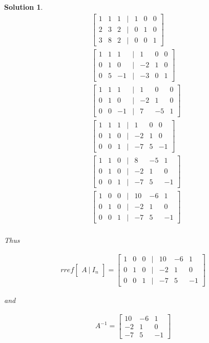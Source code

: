 \documentclass{article}
\newtheorem*{solution}{Solution}
\begin{document}
\begin{solution}
\begin{align*}
& \begin{bmatrix}
1 & 1 & 1 & \vert & 1 & 0 & 0 \\
2 & 3 & 2 & \vert & 0 & 1 & 0 \\
3 & 8 & 2 & \vert & 0 & 0 & 1
\end{bmatrix} \\
& \begin{bmatrix}
1 & 1 & 1 & \vert & 1 & 0 & 0 \\
0 & 1 & 0 & \vert & -2 & 1 & 0 \\
0 & 5 & -1 & \vert & -3 & 0 & 1
\end{bmatrix} \\
& \begin{bmatrix}
1 & 1 & 1 & \vert & 1 & 0 & 0 \\
0 & 1 & 0 & \vert & -2 & 1 & 0 \\
0 & 0 & -1 & \vert & 7 & -5 & 1
\end{bmatrix} \\
& \begin{bmatrix}
1 & 1 & 1 & \vert & 1 & 0 & 0 \\
0 & 1 & 0 & \vert & -2 & 1 & 0 \\
0 & 0 & 1 & \vert & -7 & 5 & -1
\end{bmatrix} \\
& \begin{bmatrix}
1 & 1 & 0 & \vert & 8 & -5 & 1 \\
0 & 1 & 0 & \vert & -2 & 1 & 0 \\
0 & 0 & 1 & \vert & -7 & 5 & -1
\end{bmatrix} \\
& \begin{bmatrix}
1 & 0 & 0 & \vert & 10 & -6 & 1 \\
0 & 1 & 0 & \vert & -2 & 1 & 0 \\
0 & 0 & 1 & \vert & -7 & 5 & -1
\end{bmatrix} \\
\end{align*}

Thus 

\begin{align*}
rref \begin{bmatrix} A \ \vert \ I_{n} \end{bmatrix} = \begin{bmatrix}
1 & 0 & 0 & \vert & 10 & -6 & 1 \\
0 & 1 & 0 & \vert & -2 & 1 & 0 \\
0 & 0 & 1 & \vert & -7 & 5 & -1
\end{bmatrix}
\end{align*}

and 

\begin{align*}
A^{-1} = \begin{bmatrix}
10 & -6 & 1 \\
-2 & 1 & 0 \\
-7 & 5 & -1
\end{bmatrix}
\end{align*}

\end{solution}
\end{document}
